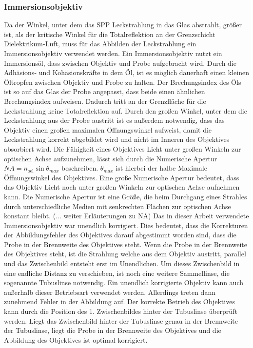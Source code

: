 \documentclass[titlepage]{article}
\begin{document}
	\subsubsection{Immersionsobjektiv}
	Da der Winkel, unter dem das SPP Leckstrahlung in das Glas abstrahlt, größer ist, als der kritische Winkel für die Totalreflektion an der Grenzschicht Dielektrikum-Luft, muss für das Abbilden der Leckstrahlung ein Immersionsobjektiv verwendet werden. Ein Immersionsobjektiv nutzt ein Immersionsöl, dass zwischen Objektiv und Probe aufgebracht wird. Durch die Adhäsions- und Kohäsionskräfte in dem Öl, ist es möglich dauerhaft einen kleinen Öltropfen zwischen Objektiv und Probe zu halten. Der Brechungsindex des Öls ist so auf das Glas der Probe angepasst, dass beide einen ähnlichen Brechungsindex aufweisen. Dadurch tritt an der Grenzfläche für die Leckstrahlung keine Totalreflektion auf. Durch den großen Winkel, unter dem die Leckstrahlung aus der Probe austritt ist es außerdem notwendig, dass das Objektiv einen großen maximalen Öffnungswinkel aufweist, damit die Leckstrahlung korrekt abgebildet wird und nicht im Inneren des Objektives absorbiert wird. Die Fähigkeit eines Objektives Licht unter großen Winkeln zur optischen Achse aufzunehmen, lässt sich durch die Numerische Apertur $NA = n_{\mathrm{oel}}\sin\theta_{max}$ beschreiben. $\theta_{max}$ ist hierbei der halbe Maximale Öffnungswinkel des Objektives. Eine große Numerische Apertur bedeutet, dass das Objektiv Licht noch unter großen Winkeln zur optischen Achse aufnehmen kann. Die Numerische Apertur ist eine Größe, die beim Durchgang eines Strahles durch unterschiedliche Medien mit senkrechten Flächen zur optischen Achse konstant bleibt. (... weiter Erläuterungen zu NA) Das in dieser Arbeit verwendete Immersionsobjektiv war unendlich korrigiert. Dies bedeutet, dass die Korrekturen der Abbildungsfehler des Objektives darauf abgestimmt worden sind, dass die Probe in der Brennweite des Objektives steht. Wenn die Probe in der Brennweite des Objektives steht, ist die Strahlung welche aus dem Objektiv austritt, parallel und das Zwischenbild entsteht erst im Unendlichen. Um dieses Zwischenbild in eine endliche Distanz zu verschieben, ist noch eine weitere Sammellinse, die sogenannte Tubuslinse notwendig. Ein unendlich korrigierte Objektiv kann auch außerhalb dieser Betriebsart verwendet werden. Allerdings treten dann zunehmend Fehler in der Abbildung auf. Der korrekte Betrieb des Objektives kann durch die Position des  1. Zwischenbildes hinter der Tubuslinse überprüft werden. Liegt das Zwischenbild hinter der Tubuslinse genau in der Brennweite der Tubuslinse, liegt die Probe in der Brennweite des Objektives und die Abbildung des Objektives ist optimal korrigiert.\cite{Kuhl.2018}
\end{document}
